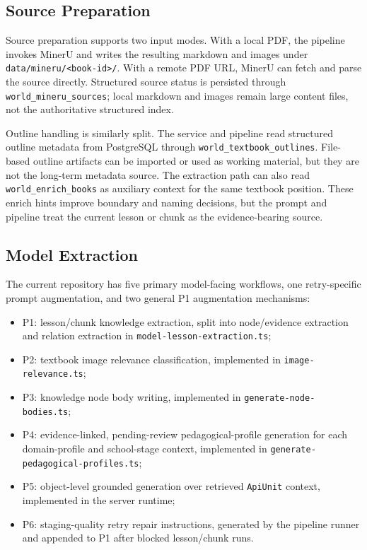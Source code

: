 \documentclass[11pt,letterpaper]{article}
\newcommand{\code}[1]{\nolinkurl{#1}}
\begin{document}
\subsection{Source Preparation}

Source preparation supports two input modes. With a local PDF, the pipeline invokes MinerU and writes the resulting markdown and images under \code{data/mineru/<book-id>/}. With a remote PDF URL, MinerU can fetch and parse the source directly. Structured source status is persisted through \code{world_mineru_sources}; local markdown and images remain large content files, not the authoritative structured index.

Outline handling is similarly split. The service and pipeline read structured outline metadata from PostgreSQL through \code{world_textbook_outlines}. File-based outline artifacts can be imported or used as working material, but they are not the long-term metadata source. The extraction path can also read \code{world_enrich_books} as auxiliary context for the same textbook position. These enrich hints improve boundary and naming decisions, but the prompt and pipeline treat the current lesson or chunk as the evidence-bearing source.

\subsection{Model Extraction}

The current repository has five primary model-facing workflows, one retry-specific prompt augmentation, and two general P1 augmentation mechanisms:

\begin{itemize}
  \item P1: lesson/chunk knowledge extraction, split into node/evidence extraction and relation extraction in \code{model-lesson-extraction.ts};
  \item P2: textbook image relevance classification, implemented in \code{image-relevance.ts};
  \item P3: knowledge node body writing, implemented in \code{generate-node-bodies.ts};
  \item P4: evidence-linked, pending-review pedagogical-profile generation for each domain-profile and school-stage context, implemented in \code{generate-pedagogical-profiles.ts};
  \item P5: object-level grounded generation over retrieved \code{ApiUnit} context, implemented in the server runtime;
  \item P6: staging-quality retry repair instructions, generated by the pipeline runner and appended to P1 after blocked lesson/chunk runs.
\end{itemize}
\end{document}
